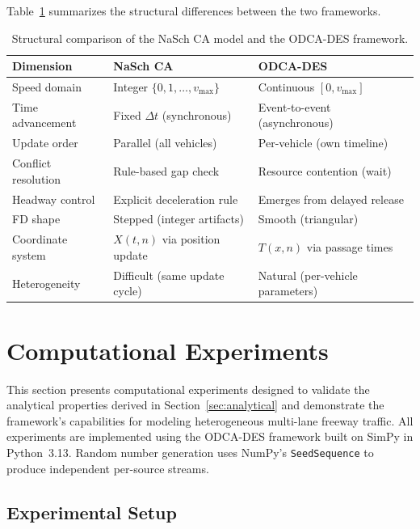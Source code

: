 \documentclass[review,authoryear]{elsarticle}
\begin{document}
Table~\ref{tab:comparison_summary} summarizes the structural differences between the two frameworks.

\begin{table}[ht]
\centering
\caption{Structural comparison of the NaSch CA model and the ODCA-DES framework.}
\label{tab:comparison_summary}
\begin{tabular}{@{}lll@{}}
\toprule
Dimension & NaSch CA & ODCA-DES \\
\midrule
Speed domain & Integer $\{0,1,\ldots,v_{\max}\}$ & Continuous $[0, v_{\max}]$ \\
Time advancement & Fixed $\Delta t$ (synchronous) & Event-to-event (asynchronous) \\
Update order & Parallel (all vehicles) & Per-vehicle (own timeline) \\
Conflict resolution & Rule-based gap check & Resource contention (wait) \\
Headway control & Explicit deceleration rule & Emerges from delayed release \\
FD shape & Stepped (integer artifacts) & Smooth (triangular) \\
Coordinate system & $X(t,n)$ via position update & $T(x,n)$ via passage times \\
Heterogeneity & Difficult (same update cycle) & Natural (per-vehicle parameters) \\
\bottomrule
\end{tabular}
\end{table}


\section{Computational Experiments}
\label{sec:experiments}

This section presents computational experiments designed to validate the analytical properties derived in Section~\ref{sec:analytical} and demonstrate the framework's capabilities for modeling heterogeneous multi-lane freeway traffic. All experiments are implemented using the ODCA-DES framework built on SimPy \citep{simpy2023} in Python~3.13. Random number generation uses NumPy's \texttt{SeedSequence} to produce independent per-source streams.

\subsection{Experimental Setup}
\label{sec:exp_setup}
\end{document}
